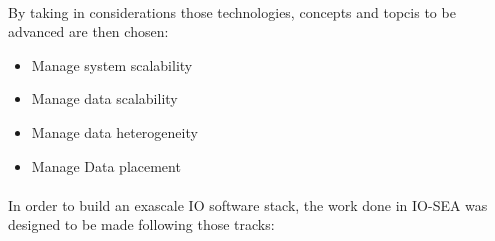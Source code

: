 \paragraph{}
By taking in considerations those technologies, concepts and topcis to be advanced are then chosen:
\begin{itemize}
    \item Manage system scalability
    \item Manage data scalability
    \item Manage data heterogeneity
    \item Manage Data placement
\end{itemize}

\paragraph{}
In order to build an exascale IO software stack, the work done in IO-SEA was designed to be made following
those tracks:
